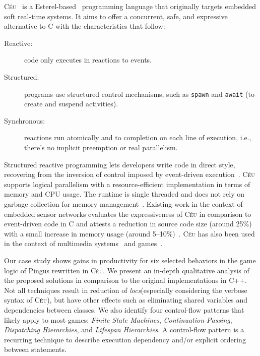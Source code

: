 \documentclass[times,twocolumn,final]{elsarticle}
\newcommand{\CEU}{\textsc{C\'{e}u}\xspace}
\newcommand{\locs}{\emph{locs}\xspace}
\newcommand{\code}[1] {{\small{\texttt{#1}}}}
\begin{document}
\CEU~\cite{ceu.sensys13,ceu.mod15} is a Esterel-based~\cite{esterel.ieee91}
programming language that originally targets embedded soft real-time systems.
It aims to offer a concurrent, safe, and expressive alternative to C with the
characteristics that follow:
%
\begin{description}
\item [Reactive:] code only executes in reactions to events.
\item [Structured:] programs use structured control mechanisms, such as
    \code{spawn} and \code{await} (to create and suspend activities).
\item [Synchronous:] reactions run atomically and to completion on each line of
    execution, i.e., there's no implicit preemption or real parallelism.
\end{description}
%
Structured reactive programming lets developers write code in direct style,
recovering from the inversion of control imposed by event-driven
execution~\cite{rp.deprecating,rp.rescala,sync_async.cooperative}.
%
%
\CEU supports logical parallelism with a resource-efficient implementation in
terms of memory and CPU usage.
The runtime is single threaded and does not rely on garbage collection for
memory management~\cite{ceu.sensys13}.
%
Existing work in the context of embedded sensor networks evaluates the
expressiveness of \CEU in comparison to event-driven code in C and attests a
reduction in source code size (around 25\%) with a small increase in memory
usage (around 5--10\%)~\cite{ceu.sensys13}.
%
\CEU has also been used in the context of multimedia
systems~\cite{ceumedia.webmedia16} and games~\cite{ceu.mod15}.

Our case study shows gains in productivity for six selected behaviors in the
game logic of Pingus rewritten in \CEU.
We present an in-depth qualitative analysis of the proposed solutions in
comparison to the original implementations in C++.
%
Not all techniques result in reduction of \locs (especially considering the
verbose syntax of \CEU), but have other effects such as eliminating shared
variables and dependencies between classes.
%
We also identify four control-flow patterns that likely apply to most games:
        \emph{Finite State Machines},
        \emph{Continuation Passing},
        \emph{Dispatching Hierarchies}, and
        \emph{Lifespan Hierarchies}.
%
A control-flow pattern is a recurring technique to describe execution
dependency and/or explicit ordering between statements.
\end{document}
